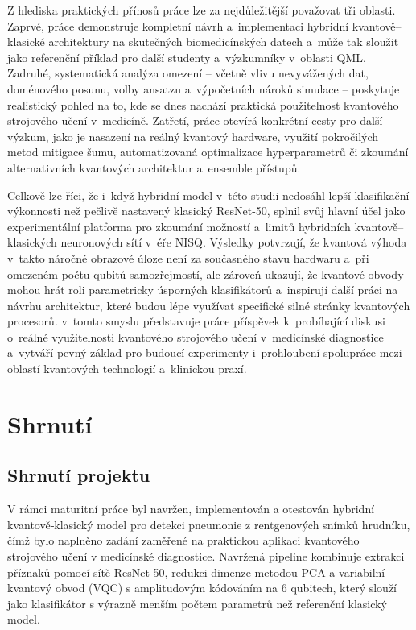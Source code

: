 \documentclass[12pt, a4paper]{report}
\begin{document}
Z hlediska praktických přínosů práce lze za nejdůležitější považovat tři oblasti. Zaprvé, práce demonstruje kompletní návrh a~implementaci hybridní kvantově–klasické architektury na skutečných biomedicínských datech a~může tak sloužit jako referenční příklad pro další studenty a~výzkumníky v~oblasti QML. Zadruhé, systematická analýza omezení – včetně vlivu nevyvážených dat, doménového posunu, volby ansatzu a~výpočetních nároků simulace – poskytuje realistický pohled na to, kde se dnes nachází praktická použitelnost kvantového strojového učení v~medicíně. Zatřetí, práce otevírá konkrétní cesty pro další výzkum, jako je nasazení na reálný kvantový hardware, využití pokročilých metod mitigace šumu, automatizovaná optimalizace hyperparametrů či zkoumání alternativních kvantových architektur a~ensemble přístupů.

Celkově lze říci, že i~když hybridní model v~této studii nedosáhl lepší klasifikační výkonnosti než pečlivě nastavený klasický ResNet-50, splnil svůj hlavní účel jako experimentální platforma pro zkoumání možností a~limitů hybridních kvantově–klasických neuronových sítí v~éře NISQ. Výsledky potvrzují, že kvantová výhoda v~takto náročné obrazové úloze není za současného stavu hardwaru a~při omezeném počtu qubitů samozřejmostí, ale zároveň ukazují, že kvantové obvody mohou hrát roli parametricky úsporných klasifikátorů a~inspirují další práci na návrhu architektur, které budou lépe využívat specifické silné stránky kvantových procesorů. v~tomto smyslu představuje práce příspěvek k~probíhající diskusi o~reálné využitelnosti kvantového strojového učení v~medicínské diagnostice a~vytváří pevný základ pro budoucí experimenty i~prohloubení spolupráce mezi oblastí kvantových technologií a~klinickou praxí.

\section{Shrnutí}
\subsection{Shrnutí projektu}

V rámci maturitní práce byl navržen, implementován a otestován hybridní kvantově‑klasický model pro detekci pneumonie z rentgenových snímků hrudníku, čímž bylo naplněno zadání zaměřené na praktickou aplikaci kvantového strojového učení v medicínské diagnostice. Navržená pipeline kombinuje extrakci příznaků pomocí sítě ResNet‑50, redukci dimenze metodou PCA a variabilní kvantový obvod (VQC) s amplitudovým kódováním na 6 qubitech, který slouží jako klasifikátor s výrazně menším počtem parametrů než referenční klasický model.
\end{document}
